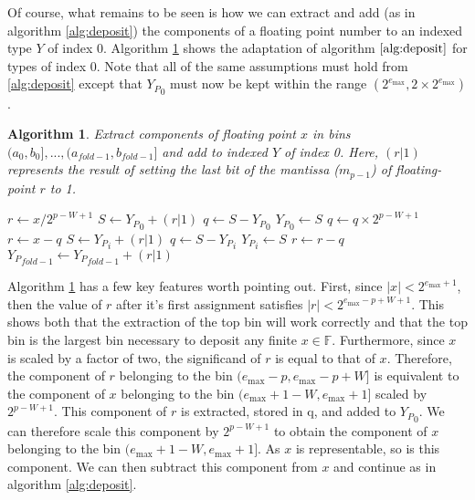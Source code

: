 \documentclass[12pt]{article}
\providecommand{\F}{\ensuremath{\mathbb{F}}}
\providecommand{\max}{\ensuremath{\text{max}}}
\theoremstyle{plain}
\newtheorem{alg}{Algorithm}[section]
\begin{document}
      Of course, what remains to be seen is how we can extract and add (as in algorithm \ref{alg:deposit}) the components of a floating point number to an indexed type $Y$ of index 0. Algorithm \ref{alg:deposit0} shows the adaptation of algorithm $\ref{alg:deposit}$ for types of index 0. Note that all of the same assumptions must hold from \ref{alg:deposit} except that ${Y_P}_0$ must now be kept within the range $(2^{e_{\max}}, 2 \times 2^{e_{\max}})$.
      \begin{alg}
        Extract components of floating point $x$ in bins $(a_0, b_0], ..., (a_{fold - 1}, b_{fold - 1}]$ and add to indexed $Y$ of index 0. Here, $(r | 1)$ represents the result of setting the last bit of the mantissa ($m_{p - 1}$) of floating-point $r$ to 1.
        \begin{algorithmic}
            \State $r \gets x / 2^{p - W + 1}$
            \State $S \gets {Y_P}_0 + (r | 1)$
            \State $q \gets S - {Y_P}_0$
            \State ${Y_P}_0 \gets S$
            \State $q \gets q \times 2^{p - W + 1}$
            \State $r \gets x - q$
              \State $S \gets {Y_P}_i + (r | 1)$
              \State $q \gets S - {Y_P}_i$
              \State ${Y_P}_i \gets S$
              \State $r \gets r - q$
            \EndFor
            \State ${Y_P}_{fold - 1} \gets {Y_P}_{fold - 1} + (r | 1)$
          \EndFunction
        \end{algorithmic}
        \label{alg:deposit0}
      \end{alg}

      Algorithm \ref{alg:deposit0} has a few key features worth pointing out. First, since $|x| < 2^{e_{\max} + 1}$, then the value of $r$ after it's first assignment satisfies $|r| < 2^{e_{\max} - p + W + 1}$. This shows both that the extraction of the top bin will work correctly and that the top bin is the largest bin necessary to deposit any finite $x \in \F$.
      Furthermore, since $x$ is scaled by a factor of two, the significand of $r$ is equal to that of $x$.
      Therefore, the component of $r$ belonging to the bin $(e_{\max} - p, e_{\max} - p + W]$ is equivalent to the component of $x$ belonging to the bin $(e_{\max} + 1 - W, e_{\max} + 1]$ scaled by $2^{p - W + 1}$. This component of $r$ is extracted, stored in q, and added to ${Y_P}_0$. We can therefore scale this component by $2^{p - W + 1}$ to obtain the component of $x$ belonging to the bin $(e_{\max} + 1 - W, e_{\max} + 1]$. As $x$ is representable, so is this component. We can then subtract this component from $x$ and continue as in algorithm \ref{alg:deposit}.
\end{document}
